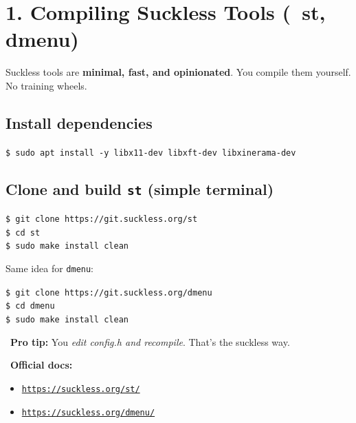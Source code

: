 \documentclass[12pt]{article}
\newcommand{\compileicon}{\faCogs}
\newcommand{\bookicon}{\faBook}
\newcommand{\fireicon}{\faFire}
\begin{document}
\section*{1. Compiling Suckless Tools (\compileicon\ st, dmenu)}

Suckless tools are \textbf{minimal, fast, and opinionated}. You compile them yourself. No training wheels.

\subsection*{Install dependencies}

\begin{highlightbox}
\texttt{\$ sudo apt install -y libx11-dev libxft-dev libxinerama-dev}
\end{highlightbox}

\subsection*{Clone and build \texttt{st} (simple terminal)}

\begin{highlightbox}
\texttt{\$ git clone https://git.suckless.org/st}\\
\texttt{\$ cd st}\\
\texttt{\$ sudo make install clean}
\end{highlightbox}

Same idea for \texttt{dmenu}:

\begin{highlightbox}
\texttt{\$ git clone https://git.suckless.org/dmenu}\\
\texttt{\$ cd dmenu}\\
\texttt{\$ sudo make install clean}
\end{highlightbox}

\begin{infobox}
\fireicon\ \textbf{Pro tip:} You \textit{edit config.h and recompile}. That's the suckless way.
\end{infobox}

\begin{infobox}
\bookicon\ \textbf{Official docs:}
\begin{itemize}
    \item \href{https://suckless.org/st/}{\texttt{https://suckless.org/st/}}
    \item \href{https://suckless.org/dmenu/}{\texttt{https://suckless.org/dmenu/}}
\end{itemize}
\end{infobox}
\end{document}
